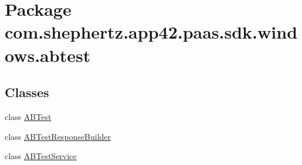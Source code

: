\hypertarget{namespacecom_1_1shephertz_1_1app42_1_1paas_1_1sdk_1_1windows_1_1abtest}{\section{Package com.\+shephertz.\+app42.\+paas.\+sdk.\+windows.\+abtest}
\label{namespacecom_1_1shephertz_1_1app42_1_1paas_1_1sdk_1_1windows_1_1abtest}
}
\subsection*{Classes}
\begin{DoxyCompactItemize}
\item 
class \hyperlink{classcom_1_1shephertz_1_1app42_1_1paas_1_1sdk_1_1windows_1_1abtest_1_1_a_b_test}{A\+B\+Test}
\item 
class \hyperlink{classcom_1_1shephertz_1_1app42_1_1paas_1_1sdk_1_1windows_1_1abtest_1_1_a_b_test_response_builder}{A\+B\+Test\+Response\+Builder}
\item 
class \hyperlink{classcom_1_1shephertz_1_1app42_1_1paas_1_1sdk_1_1windows_1_1abtest_1_1_a_b_test_service}{A\+B\+Test\+Service}
\end{DoxyCompactItemize}
